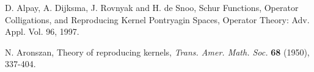 \begin{thebibliography}{99}

 {\sc D. Alpay, A. Dijksma, J. Rovnyak and H. de Snoo}, Schur Functions, Operator
Colligations, and Reproducing Kernel Pontryagin Spaces, Operator Theory: Adv. Appl. Vol. 96,
1997.

 {\sc N. Aronszan}, Theory of reproducing kernels, {\it Trans. Amer. Math. Soc.}
\textbf{68} (1950), 337-404.  



\end{thebibliography}
